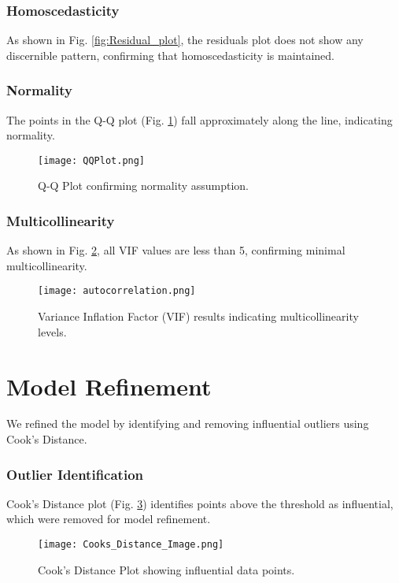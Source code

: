 \documentclass[8pt,twocolumn,twoside]{pnas-new}
\begin{document}
\subsubsection*{Homoscedasticity}
As shown in Fig. \ref{fig:Residual_plot}, the residuals plot does not show any discernible pattern, confirming that homoscedasticity is maintained.

\subsubsection*{Normality}
The points in the Q-Q plot (Fig. \ref{fig:QQplot}) fall approximately along the line, indicating normality.
\begin{figure}[!htbp]
    \centering
    \texttt{[image: QQPlot.png]} 
    \caption{Q-Q Plot confirming normality assumption.}
    \label{fig:QQplot}
\end{figure}

\subsubsection*{Multicollinearity}
As shown in Fig. \ref{fig:VIF}, all VIF values are less than 5, confirming minimal multicollinearity.
\begin{figure}[!htbp]
    \centering
    \texttt{[image: autocorrelation.png]}
    \caption{Variance Inflation Factor (VIF) results indicating multicollinearity levels.}
    \label{fig:VIF}
\end{figure}

\section*{Model Refinement}
We refined the model by identifying and removing influential outliers using Cook’s Distance.

\subsubsection*{Outlier Identification}
Cook's Distance plot (Fig. \ref{fig:Cooks_Distance}) identifies points above the threshold as influential, which were removed for model refinement.
\begin{figure}[!htbp]
    \centering
    \texttt{[image: Cooks\_Distance\_Image.png]}
    \caption{Cook's Distance Plot showing influential data points.}
    \label{fig:Cooks_Distance}
\end{figure}
\end{document}
